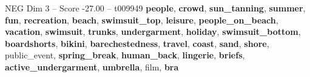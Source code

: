 \begin{textsample}{NEG Dim 3 – Score -27.00 – t009949}  \label{ex:f3_neg_009}
\textbf{people}, \textbf{crowd}, \textbf{sun\_tanning}, \textbf{summer}, \textbf{fun}, \textbf{recreation}, \textbf{beach}, \textbf{swimsuit\_top}, \textbf{leisure}, \textbf{people\_on\_beach}, \textbf{vacation}, \textbf{swimsuit}, \textbf{trunks}, \textbf{undergarment}, \textbf{holiday}, \textbf{swimsuit\_bottom}, \textbf{boardshorts}, \textbf{bikini}, \textbf{barechestedness}, \textbf{travel}, \textbf{coast}, \textbf{sand}, \textbf{shore}, public\_event, \textbf{spring\_break}, \textbf{human\_back}, \textbf{lingerie}, \textbf{briefs}, \textbf{active\_undergarment}, \textbf{umbrella}, film, \textbf{bra}

\end{textsample}
